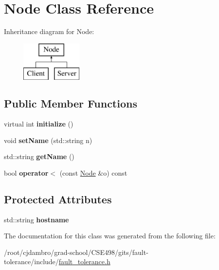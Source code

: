 \hypertarget{classNode}{\section{Node Class Reference}
\label{classNode}
}
Inheritance diagram for Node\-:\begin{figure}[H]
\begin{center}
\leavevmode
\includegraphics[height=2.000000cm]{classNode}
\end{center}
\end{figure}
\subsection*{Public Member Functions}
\begin{DoxyCompactItemize}
\item 
\hypertarget{classNode_acfbc12d3b7d414fb12811041b04a1809}{virtual int {\bfseries initialize} ()}\label{classNode_acfbc12d3b7d414fb12811041b04a1809}

\item 
\hypertarget{classNode_af79916b6bb2580b7cf9397bdeb172988}{void {\bfseries set\-Name} (std\-::string n)}\label{classNode_af79916b6bb2580b7cf9397bdeb172988}

\item 
\hypertarget{classNode_a3e5ac6b5881a3a9d82f3112953c1e546}{std\-::string {\bfseries get\-Name} ()}\label{classNode_a3e5ac6b5881a3a9d82f3112953c1e546}

\item 
\hypertarget{classNode_a821b0d4eb044c0ee3a61a3a1faadbe9f}{bool {\bfseries operator$<$} (const \hyperlink{classNode}{Node} \&o) const }\label{classNode_a821b0d4eb044c0ee3a61a3a1faadbe9f}

\end{DoxyCompactItemize}
\subsection*{Protected Attributes}
\begin{DoxyCompactItemize}
\item 
\hypertarget{classNode_a9f5a57e15567a0b92cb8d25bcec7bd24}{std\-::string {\bfseries hostname}}\label{classNode_a9f5a57e15567a0b92cb8d25bcec7bd24}

\end{DoxyCompactItemize}


The documentation for this class was generated from the following file\-:\begin{DoxyCompactItemize}
\item 
/root/cjdambro/grad-\/school/\-C\-S\-E498/gits/fault-\/tolerance/include/\hyperlink{fault__tolerance_8h}{fault\-\_\-tolerance.\-h}\end{DoxyCompactItemize}
